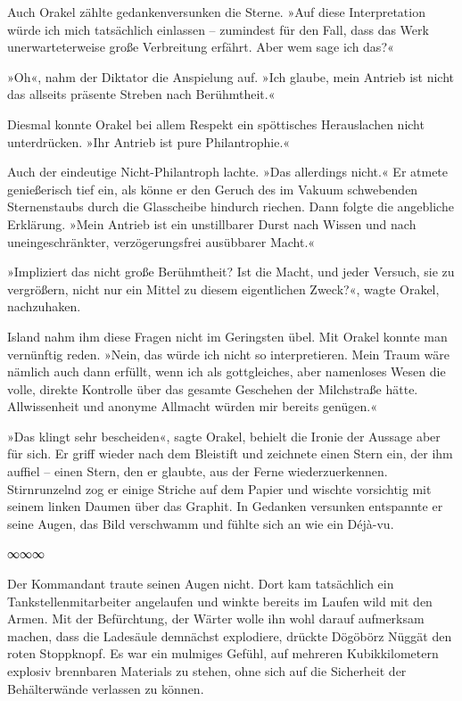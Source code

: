 Auch Orakel zählte gedankenversunken die Sterne. »Auf diese Interpretation würde ich mich tatsächlich einlassen – zumindest für den Fall, dass das Werk unerwarteterweise große Verbreitung erfährt. Aber wem sage ich das?«

»Oh«, nahm der Diktator die Anspielung auf. »Ich glaube, mein Antrieb ist nicht das allseits präsente Streben nach Berühmtheit.«

Diesmal konnte Orakel bei allem Respekt ein spöttisches Herauslachen nicht unterdrücken. »Ihr Antrieb ist pure Philantrophie.«

Auch der eindeutige Nicht-Philantroph lachte. »Das allerdings nicht.« Er atmete genießerisch tief ein, als könne er den Geruch des im Vakuum schwebenden Sternenstaubs durch die Glasscheibe hindurch riechen. Dann folgte die angebliche Erklärung. »Mein Antrieb ist ein unstillbarer Durst nach Wissen und nach uneingeschränkter, verzögerungsfrei ausübbarer Macht.«

»Impliziert das nicht große Berühmtheit? Ist die Macht, und jeder Versuch, sie zu vergrößern, nicht nur ein Mittel zu diesem eigentlichen Zweck?«, wagte Orakel, nachzuhaken.

Island nahm ihm diese Fragen nicht im Geringsten übel. Mit Orakel konnte man vernünftig reden. »Nein, das würde ich nicht so interpretieren. Mein Traum wäre nämlich auch dann erfüllt, wenn ich als gottgleiches, aber namenloses Wesen die volle, direkte Kontrolle über das gesamte Geschehen der Milchstraße hätte. Allwissenheit und anonyme Allmacht würden mir bereits genügen.«

»Das klingt sehr bescheiden«, sagte Orakel, behielt die Ironie der Aussage aber für sich. Er griff wieder nach dem Bleistift und zeichnete einen Stern ein, der ihm auffiel – einen Stern, den er glaubte, aus der Ferne wiederzuerkennen. Stirnrunzelnd zog er einige Striche auf dem Papier und wischte vorsichtig mit seinem linken Daumen über das Graphit. In Gedanken versunken entspannte er seine Augen, das Bild verschwamm und fühlte sich an wie ein Déjà-vu.

\begin{center}
∞∞∞
\end{center}

Der Kommandant traute seinen Augen nicht. Dort kam tatsächlich ein Tankstellenmitarbeiter angelaufen und winkte bereits im Laufen wild mit den Armen. Mit der Befürchtung, der Wärter wolle ihn wohl darauf aufmerksam machen, dass die Ladesäule demnächst explodiere, drückte Dögöbörz Nüggät den roten Stoppknopf. Es war ein mulmiges Gefühl, auf mehreren Kubikkilometern explosiv brennbaren Materials zu stehen, ohne sich auf die Sicherheit der Behälterwände verlassen zu können.

